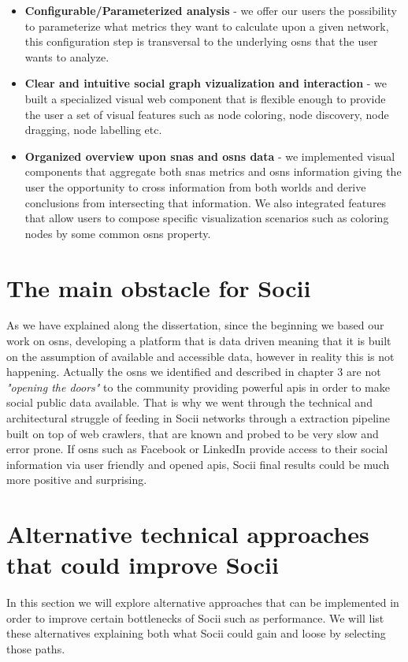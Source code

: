 \begin{itemize}
    \item \textbf{Configurable/Parameterized analysis} - we offer our users the possibility to parameterize what metrics they want to calculate upon a given network, this configuration step is transversal to the underlying \glspl{osn} that the user wants to analyze.
    \item \textbf{Clear and intuitive social graph vizualization and interaction} - we built a specialized visual web component that is flexible enough to provide the user a set of visual features such as node coloring, node discovery, node dragging, node labelling etc.
    \item \textbf{Organized overview upon \glspl{sna} and \glspl{osn} data} - we implemented visual components that aggregate both \glspl{sna} metrics and \glspl{osn} information giving the user the opportunity to cross information from both worlds and derive conclusions from intersecting that information. We also integrated features that allow users to compose specific visualization scenarios such as coloring nodes by some common \glspl{osn} property.
\end{itemize}

\section{The main obstacle for Socii}
As we have explained along the dissertation, since the beginning we based our work on \glspl{osn}, developing a platform that is data driven meaning that it is built on the assumption of available and accessible data, however in reality this is not happening. Actually the \glspl{osn} we identified and described in chapter 3 are not \textit{"opening the doors"} to the community providing powerful \glspl{api} in order to make social public data available. That is why we went through the technical and architectural struggle of feeding in Socii networks through a extraction pipeline built on top of web crawlers, that are known and probed to be very slow and error prone. If \glspl{osn} such as Facebook or LinkedIn provide access to their social information via user friendly and opened \glspl{api}, Socii final results could be much more positive and surprising.

\section{Alternative technical approaches that could improve Socii}
In this section we will explore alternative approaches that can be implemented in order to improve certain bottlenecks of Socii such as performance. We will list these alternatives explaining both what Socii could gain and loose by selecting those paths.


